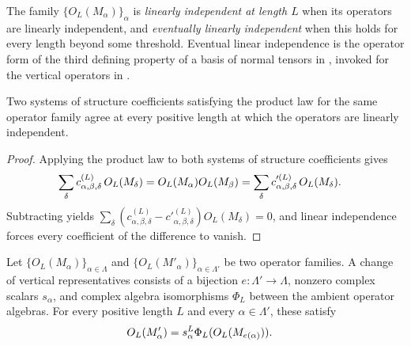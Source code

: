 \begin{definition}%
    \label{def:mpdo_bnt_label_linear_independent}
    \leanok
    The family $\{O_L(M_\alpha)\}_\alpha$ is \emph{linearly independent at length $L$}
    when its operators are linearly independent, and
    \emph{eventually linearly independent} when this holds for every length
    beyond some threshold. Eventual linear independence is the
    operator form of the third defining property of a basis of normal
    tensors in \cite[Section~2.3]{Cirac2016MPDO_arXiv}, invoked for the
    vertical operators in \cite[Appendix~C.4]{Cirac2016MPDO_arXiv}.
\end{definition}

\begin{lemma}%
    \label{thm:mpdo_bnt_label_coeff_unique}
    \leanok
    Two systems of structure coefficients satisfying the product law for the
    same operator family agree at every positive length at which the
    operators are linearly independent.
\end{lemma}
\begin{proof}\leanok
    Applying the product law to both systems of structure coefficients gives
    \begin{align}
        \sum_\delta c^{(L)}_{\alpha,\beta,\delta}\,O_L(M_\delta)
         & =
        O_L(M_\alpha)O_L(M_\beta)
        =
        \sum_\delta c'^{(L)}_{\alpha,\beta,\delta}\,O_L(M_\delta).
        \notag
    \end{align}
    Subtracting yields
    $\sum_\delta (c^{(L)}_{\alpha,\beta,\delta}
        - c'^{(L)}_{\alpha,\beta,\delta})O_L(M_\delta) = 0$,
    and linear independence forces every coefficient of the difference to
    vanish.
\end{proof}

\begin{definition}%
    \label{def:mpdo_vertical_bnt_explicit_transport}
    \leanok
    Let $\{O_L(M_\alpha)\}_{\alpha\in\Lambda}$ and
    $\{O_L(M'_\alpha)\}_{\alpha\in\Lambda'}$ be two operator families.
    A change of vertical representatives consists of a bijection
    $e:\Lambda'\to\Lambda$, nonzero complex scalars $s_\alpha$, and complex algebra
    isomorphisms $\Phi_L$ between the ambient operator algebras.
    For every positive length $L$ and every $\alpha\in\Lambda'$, these satisfy
    \begin{align}
        O_L(M'_\alpha) & =s_\alpha^L\Phi_L(O_L(M_{e(\alpha)})).
        \notag
    \end{align}
\end{definition}

